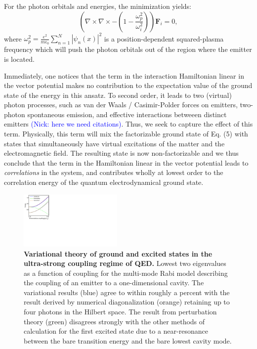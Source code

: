 \documentclass[aps,prl,twocolumn,
	groupedaddress,superscriptaddress,
	amsfonts,amssymb,amsmath,floatfix,
	citeautoscript]{revtex4-1}
\newcommand{\Jadd}[1]{\textcolor{blue}{#1}}
\begin{document}
For the photon orbitals and energies, the minimization yields:
\begin{equation}
\left( \nabla\times\nabla\times - \left(1-\frac{\omega_p^2}{\omega_i^2} \right)\right)\mathbf{F}_i = 0,
\end{equation}
where $\omega_p^2 = \frac{e^2}{m\epsilon_0}\sum\limits_{n=1}^N |\psi_n(x)|^2$ is a position-dependent squared-plasma frequency which will push the photon orbitals out of the region where the emitter is located.

Immediately, one notices that the term in the interaction Hamiltonian linear in the vector potential makes no contribution to the expectation value of the ground state of the energy in this ansatz. To second order, it leads to two (virtual) photon processes, such as van der Waals / Casimir-Polder forces on emitters, two-photon spontaneous emission, and effective interactions betweeen distinct emitters \Jadd{(Nick: here we need citations)}. Thus, we seek to capture the effect of this term. Physically, this term will mix the factorizable ground state of Eq. (5) with states that simultaneously have virtual excitations of the matter and the electromagnetic field. The resulting state is now non-factorizable and we thus conclude that the term in the Hamiltonian linear in the vector potential leads to \textit{correlations} in the system, and contributes wholly at lowest order to the correlation energy of the quantum electrodynamical ground state.
\begin{figure}[t]
\includegraphics[width=5cm]{figure2new.pdf}
\caption{\textbf{Variational theory of ground and excited states in the ultra-strong coupling regime of QED.} Lowest two eigenvalues as a function of coupling for the multi-mode Rabi model describing the coupling of an emitter to a one-dimensional cavity. The variational results (blue) agree to within roughly a percent with the result derived by numerical diagonalization (orange) retaining up to four photons in the Hilbert space. The result from perturbation theory (green) disagrees strongly with the other methods of calculation for the first excited state due to a near-resonance between the bare transition energy and the bare lowest cavity mode.}
\label{fig:ansatz}
\end{figure}
\end{document}
